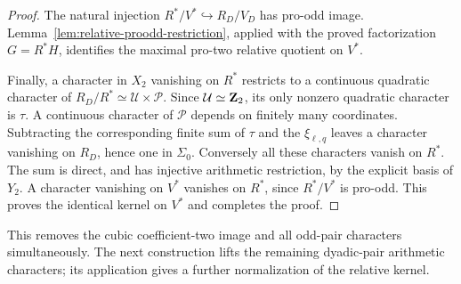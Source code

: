 \begin{proof}
The natural injection
\(R^*/V^*\hookrightarrow R_D/V_D\) has pro-odd image.
Lemma~\ref{lem:relative-proodd-restriction}, applied with the proved
factorization \(G=R^*H\), identifies the maximal pro-two relative
quotient on \(V^*\).

Finally, a character in \(X_2\) vanishing on \(R^*\) restricts
to a continuous quadratic character of
\(R_D/R^*\simeq\mathcal U\times\mathcal P\).
Since \(\mathcal U\simeq\mathbf Z_2\), its only nonzero quadratic
character is \(\tau\). A continuous character of \(\mathcal P\)
depends on finitely many coordinates. Subtracting the corresponding
finite sum of \(\tau\) and the \(\xi_{\ell,q}\) leaves a character
vanishing on \(R_D\), hence one in \(\Sigma_0\).
Conversely all these characters vanish on \(R^*\).
The sum is direct, and has injective arithmetic restriction, by the
explicit basis of \(Y_2\). A character vanishing on \(V^*\)
vanishes on \(R^*\), since \(R^*/V^*\) is pro-odd. This proves
the identical kernel on \(V^*\) and completes the proof.
\end{proof}

This removes the cubic coefficient-two image and all odd-pair
characters simultaneously. The next construction lifts the remaining
dyadic-pair arithmetic characters; its application gives a further
normalization of the relative kernel.
